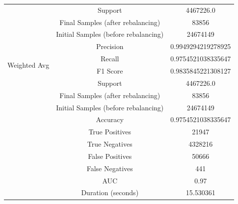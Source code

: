 \begin{longtable}{|c|c|c|}
 & Support & 4467226.0 \\
 & Final Samples (after rebalancing) & 83856 \\
 & Initial Samples (before rebalancing) & 24674149 \\
\hline
\multirow{4}{*}{Weighted Avg} & Precision & 0.9949294219278925 \\
 & Recall & 0.9754521038335647 \\
 & F1 Score & 0.9835845221308127 \\
 & Support & 4467226.0 \\
 & Final Samples (after rebalancing) & 83856 \\
 & Initial Samples (before rebalancing) & 24674149 \\
\hline
& Accuracy & 0.9754521038335647 \\ \hline
& True Positives & 21947 \\ \hline
& True Negatives & 4328216 \\ \hline
& False Positives & 50666 \\ \hline
& False Negatives & 441 \\ \hline
& AUC & 0.97 \\ \hline
& Duration (seconds) & 15.530361 \\ \hline
\end{longtable}


